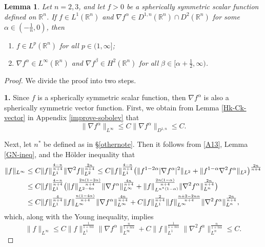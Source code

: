 \documentclass[11pt,reqno]{amsart}
\newtheorem{lem}{Lemma}[section]
\numberwithin{rk}{section}
\numberwithin{prop}{section}
\numberwithin{mydef}{section}
\numberwithin{lem}{section}
\numberwithin{equation}{section}
\numberwithin{thm}{section}
\begin{document}
\begin{lem}\label{initial3}
Let $n=2,3$, and let $f>0$ be a spherically symmetric scalar function defined on $\mathbb{R}^n$. If $f\in L^1(\mathbb{R}^n)$ and $\nabla f^{\alpha}\in D^{1,n}(\mathbb{R}^n)\cap D^2(\mathbb{R}^n)$ for some $\alpha\in (-\frac{1}{n},0)$, then  
\begin{enumerate}
\item[$\mathrm{(i)}$] $f\in L^p(\mathbb{R}^n)$ for all $p\in (1, \infty]${\rm ;}
\smallskip
\item[$\mathrm{(ii)}$] $\nabla f^{\alpha}\in  L^\infty(\mathbb{R}^n)$ and $\nabla f^\beta\in  H^2(\mathbb{R}^n)$  for all $\beta\in[\alpha+\frac{1}{2},\infty)$.
\end{enumerate}
\end{lem}
\begin{proof}
We divide the proof into two steps.

\smallskip
\textbf{1.} Since $f$ is a spherically symmetric scalar function, then $\nabla f^\alpha$ is also a spherically symmetric vector function.
\smallskip
First,  we obtain from Lemma \ref{Hk-Ck-vector} in Appendix \ref{improve-sobolev} that
\begin{equation}\label{A13}
\|\nabla f^\alpha\|_{L^\infty}\leq C\|\nabla f^\alpha\|_{D^{1,n}}\leq C.
\end{equation}

Next, let $n^*$ be defined as in \S\ref{othernote}. Then it follows from \eqref{A13}, Lemma \ref{GN-ineq}, and the H\"older inequality that
\begin{equation*}
\begin{aligned}
\|f\|_{L^\infty}&\leq C\|f\|_{L^1}^\frac{4-n}{n+4}\|\nabla^2 f\|_{L^2}^\frac{2n}{n+4} \leq C\|f\|_{L^1}^\frac{4-n}{n+4}\big(\|f^{1-2\alpha}|\nabla f^\alpha|^2\|_{L^2}+\|f^{1-\alpha}\nabla^2 f^\alpha\|_{L^2}\big)^\frac{2n}{n+4}\\
&\leq C\|f\|_{L^1}^\frac{4-n}{n+4}\big(\|f\|_{L^{2-4\alpha}}^\frac{2n(1-2\alpha)}{n+4}\|\nabla f^\alpha\|_{L^\infty}^\frac{4n}{n+4}+ \|f\|_{L^{n^*(1-\alpha)}}^\frac{2n(1-\alpha)}{n+4}\|\nabla^2 f^\alpha\|_{L^n}^\frac{2n}{n+4}\big)\notag\\
&\leq C\|f\|_{L^1}^\frac{4}{n+4}\|f\|_{L^\infty}^\frac{n(1-4\alpha)}{n+4}\|\nabla f^\alpha\|_{L^\infty}^\frac{4n}{n+4}+C\|f\|_{L^1}^\frac{2}{n+4}\|f\|_{L^\infty}^\frac{n+2-2n\alpha}{n+4}\|\nabla^2 f^\alpha\|_{L^n}^\frac{2n}{n+4},
\end{aligned}
\end{equation*}
which, along with the Young inequality, implies
\begin{equation}\label{lemb2-1}
\|f\|_{L^\infty}\leq C\|f\|_{L^1}^\frac{1}{1+n\alpha}\|\nabla f^\alpha\|_{L^\infty}^\frac{n}{1+n\alpha}+C\|f\|_{L^1}^\frac{1}{1+n\alpha}\|\nabla^2 f^\alpha\|_{L^n}^\frac{n}{1+n\alpha}\leq C.
\end{equation}
 


\end{proof}
\end{document}
